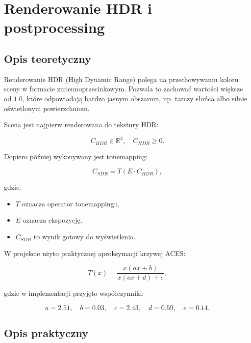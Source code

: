 \documentclass[12pt,a4paper]{article}
\begin{document}
\section{Renderowanie HDR i postprocessing}

\subsection{Opis teoretyczny}

Renderowanie HDR (High Dynamic Range) polega na przechowywaniu koloru sceny w formacie zmiennoprzecinkowym. Pozwala to zachować wartości większe od $1.0$, które odpowiadają bardzo jasnym obszarom, np. tarczy słońca albo silnie oświetlonym powierzchniom.

Scena jest najpierw renderowana do tekstury HDR:

\begin{equation}
    C_{HDR} \in \mathbb{R}^{3}, \quad C_{HDR} \geq 0.
\end{equation}

Dopiero później wykonywany jest tonemapping:

\begin{equation}
    C_{SDR} = T(E \cdot C_{HDR}),
\end{equation}

gdzie:

\begin{itemize}
    \item $T$ oznacza operator tonemappingu,
    \item $E$ oznacza ekspozycję,
    \item $C_{SDR}$ to wynik gotowy do wyświetlenia.
\end{itemize}

W projekcie użyto praktycznej aproksymacji krzywej ACES:

\begin{equation}
    T(x) =
    \frac{x(a x + b)}{x(c x + d) + e},
\end{equation}

gdzie w implementacji przyjęto współczynniki:

\begin{equation}
    a=2.51,\quad b=0.03,\quad c=2.43,\quad d=0.59,\quad e=0.14.
\end{equation}

\subsection{Opis praktyczny}
\end{document}
